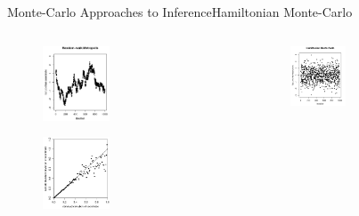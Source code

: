 \documentclass[AERbeamer%
              ,optEnglish%
              ,optBiber%
              ,optBibstyleAlphabetic%
              ,optBeamerClassicFormat%
              ]{AERlatex}%
\begin{document}
\begin{frame}[c]{Monte-Carlo Approaches to Inference}{Hamiltonian Monte-Carlo}
    \centering
    \begin{columns}
        \begin{column}{0.48\textwidth}
            \begin{figure}
                \centering
                \includegraphics[width=0.424\textwidth]{HMCPerf2.png}
            \end{figure}
            \begin{figure}
                \centering
                \includegraphics[width=0.424\textwidth]{HMCPerf4.png}
            \end{figure}
        \end{column}
        \begin{column}{0.48\textwidth}
            \begin{figure}
                \centering
                \includegraphics[width=0.424\textwidth]{HMCPerf1.png}

\end{figure}
\end{column}
\end{columns}
\end{frame}
\end{document}
